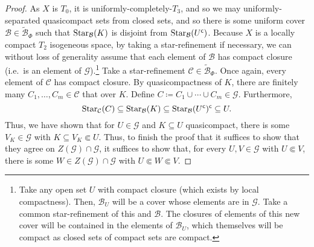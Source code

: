 \begin{thm}
\begin{savenotes}
\begin{proof}
As $X$ is $T_0$, it is uniformly-completely-$T_3$, and so we may uniformly-separated quasicompact sets from closed sets, and so there is some uniform cover $\mathcal{B}\in \widetilde{\mathcal{B}}_\Phi$ such that $\operatorname{Star} _{\mathcal{B}}(K)$ is disjoint from $\operatorname{Star} _{\mathcal{B}}(U^{\mathsf{c}})$.  Because $X$ is a locally compact $T_2$ isogeneous space, by taking a star-refinement if necessary, we can without loss of generality assume that each element of $\mathcal{B}$ has compact closure (i.e.~is an element of $\mathcal{G}$).\footnote{Take any open set $U$ with compact closure (which exists by local compactness).  Then, $\mathcal{B}_U$ will be a cover whose elements are in $\mathcal{G}$.  Take a common star-refinement of this and $\mathcal{B}$.  The closures of elements of this new cover will be contained in the elements of $\mathcal{B}_U$, which themselves will be compact as closed sets of compact sets are compact.}  Take a star-refinement $\mathcal{C}\in \widetilde{\mathcal{B}}_{\Phi}$.  Once again, every element of $\mathcal{C}$ has compact closure.  By quasicompactness of $K$, there are finitely many $C_1,\ldots ,C_m\in \mathcal{C}$ that over $K$.  Define $C\coloneqq C_1\cup \cdots \cup C_m\in \mathcal{G}$.  Furthermore,
\begin{equation}
\operatorname{Star} _{\mathcal{C}}(C)\subseteq \operatorname{Star} _{\mathcal{B}}(K)\subseteq \operatorname{Star} _{\mathcal{B}}(U^{\mathsf{c}})^{\mathsf{c}}\subseteq U.
\end{equation}
Thus, we have shown that for $U\in \mathcal{G}$ and $K\subseteq U$ quasicompact, there is some $V_K\in \mathcal{G}$ with $K\subseteq V_K\Subset U$.  Thus, to finish the proof that it suffices to show that they agree on $Z(\mathcal{G})\cap \mathcal{G}$, it suffices to show that, for every $U,V\in \mathcal{G}$ with $U\Subset V$, there is some $W\in Z(\mathcal{G})\cap \mathcal{G}$ with $U\Subset W\Subset V$.


\end{proof}
\end{savenotes}
\end{thm}
